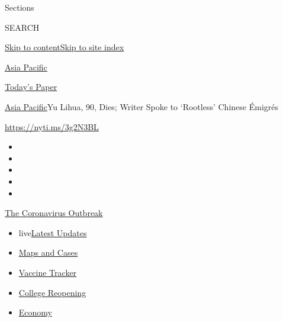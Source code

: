 Sections

SEARCH

\protect\hyperlink{site-content}{Skip to
content}\protect\hyperlink{site-index}{Skip to site index}

\href{https://www.nytimes.com/section/world/asia}{Asia Pacific}

\href{https://myaccount.nytimes.com/auth/login?response_type=cookie\&client_id=vi}{}

\href{https://www.nytimes.com/section/todayspaper}{Today's Paper}

\href{/section/world/asia}{Asia Pacific}\textbar{}Yu Lihua, 90, Dies;
Writer Spoke to `Rootless' Chinese Émigrés

\url{https://nyti.ms/3g2N3BL}

\begin{itemize}
\item
\item
\item
\item
\item
\end{itemize}

\href{https://www.nytimes.com/news-event/coronavirus?action=click\&pgtype=Article\&state=default\&region=TOP_BANNER\&context=storylines_menu}{The
Coronavirus Outbreak}

\begin{itemize}
\tightlist
\item
  live\href{https://www.nytimes.com/2020/08/03/world/coronavirus-covid-19.html?action=click\&pgtype=Article\&state=default\&region=TOP_BANNER\&context=storylines_menu}{Latest
  Updates}
\item
  \href{https://www.nytimes.com/interactive/2020/us/coronavirus-us-cases.html?action=click\&pgtype=Article\&state=default\&region=TOP_BANNER\&context=storylines_menu}{Maps
  and Cases}
\item
  \href{https://www.nytimes.com/interactive/2020/science/coronavirus-vaccine-tracker.html?action=click\&pgtype=Article\&state=default\&region=TOP_BANNER\&context=storylines_menu}{Vaccine
  Tracker}
\item
  \href{https://www.nytimes.com/2020/08/02/us/covid-college-reopening.html?action=click\&pgtype=Article\&state=default\&region=TOP_BANNER\&context=storylines_menu}{College
  Reopening}
\item
  \href{https://www.nytimes.com/live/2020/08/03/business/stock-market-today-coronavirus?action=click\&pgtype=Article\&state=default\&region=TOP_BANNER\&context=storylines_menu}{Economy}
\end{itemize}

